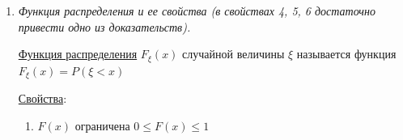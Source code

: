 \begin{enumerate}
    \hyperlink{bernoullidistribution}{Распределение Бернулли}: $B_p$ (с параметром $0 < p < 1$), $\xi$ -- число успехов при одном испытании, $p$ -- вероятность успеха при одном испытании

    \begin{tabular}{c|c|c}
        $\xi$ & $0$        & $1$    \\
        \hline
        $p$   & $1 - P(A)$ & $P(A)$
    \end{tabular} \qquad\qquad $E\xi = p$ \qquad\qquad $D\xi = p(1 - p) = pq$

    \hyperlink{binomialdistributionproperties}{Биномиальное распределение} $B_{n,p}$ (с параметрами $n, p$),
    $\xi$ -- число успехов в серии из $n$ испытаний, $p$ -- вероятность успеха при одном испытании

    $p(\xi = k) = C^k_n p^k q^{n - k}, \ k = 0, 1, \dots, n \Longleftrightarrow \xi \in B_{n,p}$

    $E\xi_i = p; \quad D\xi_i = pq$

    $E\xi = E\xi_1 + \dots + E\xi_n = p + \dots + p = np$

    $D\xi = D\xi_1 + \dots + D\xi_n = pq + \dots + pq = npq$

    \hyperlink{geometricdistributionproperties}{Геометрическое распределение} $G_p$ (с параметром $p$),
    $\xi$ -- номер 1-ого успешного испытания в бесконечной серии

    $p(\xi = k) = q^{k - 1}p, \ k = 1, 2, 3, \dots \Longleftrightarrow \xi \in G_p$

    $E\xi = \frac{1}{p}, D\xi  = \frac{q}{p^2}$

    \hyperlink{poissondistribution}{Распределение Пуассона} $\Pi_\lambda$ (с параметром $\lambda > 0$)

    Случайная величина $\xi$ имеет распределение Пуассона с параметром $\lambda > 0$, если $p(\xi = k) = \frac{\lambda^k}{k!}e^{-\lambda}, \ k = 0, 1, 2, \dots$

    $E\xi = \lambda = np, D\xi = \lambda$


    \item \textit{Функция распределения и ее свойства (в свойствах 4, 5, 6 достаточно привести одно из доказательств).}
    
    \hyperlink{distributionfunction}{Функция распределения} $F_\xi(x)$ случайной величины $\xi$ называется функция $F_\xi(x) = P(\xi < x)$

    \hyperlink{distributionfunctionproperties}{Свойства}: 

    \begin{enumerate}
        \item $F(x)$ ограничена $0 \leq F(x) \leq 1$


\end{enumerate}
\end{enumerate}
